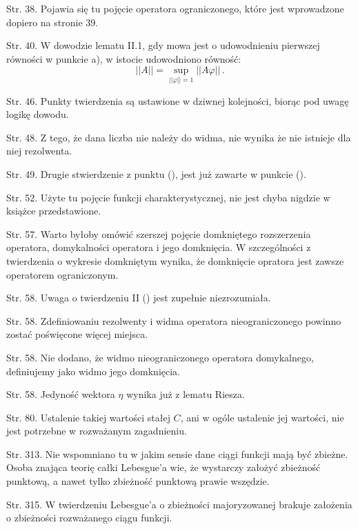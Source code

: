 \documentclass[a4paper,11pt]{article}
\begin{document}
 Str. 38. Pojawia się tu pojęcie operatora ograniczonego, które
  jest wprowadzone dopiero na stronie 39.

 Str. 40. W dowodzie lematu II.1, gdy mowa jest o udowodnieniu
  pierwszej równości w punkcie a), w istocie udowodniono równość:
  $$|| A || = \sup_{ || \varphi || = 1 } || A \varphi || \, .$$

 Str. 46. Punkty twierdzenia są ustawione w dziwnej kolejności,
  biorąc pod uwagę logikę dowodu.

 Str. 48. Z tego, że dana liczba nie należy do widma, nie wynika
  że nie istnieje dla niej rezolwenta.

 Str. 49. Drugie stwierdzenie z punktu (), jest już
  zawarte w punkcie ().

 Str. 52. Użyte tu pojęcie funkcji charakterystycznej, nie jest
  chyba nigdzie w książce przedstawione.

 Str. 57. Warto byłoby omówić szerszej pojęcie domkniętego
  rozszerzenia operatora, domykalności operatora i jego domknięcia. W
  szczególności z twierdzenia o wykresie domkniętym wynika, że
  domknięcie opratora jest zawsze operatorem ograniczonym.

 Str. 58. Uwaga o twierdzeniu II () jest zupełnie
  niezrozumiała.

 Str. 58. Zdefiniowaniu rezolwenty i widma operatora
  nieograniczonego powinno zostać poświęcone więcej miejsca.

 Str. 58. Nie dodano, że widmo nieograniczonego operatora
  domykalnego, definiujemy jako widmo jego domknięcia.

 Str. 58. Jedyność wektora $\eta$ wynika już z lematu Riesza.

 Str. 80. Ustalenie takiej wartości stałej $C$, ani w ogóle
  ustalenie jej wartości, nie jest potrzebne w rozważanym zagadnieniu.

 Str. 313. Nie wspomniano tu w jakim sensie dane ciągi funkcji
  mają być zbieżne. Osoba znająca teorię całki Lebesgue'a wie, że
  wystarczy założyć zbieżność punktową, a nawet tylko zbieżność
  punktową prawie wszędzie.

 Str. 315. W twierdzeniu Lebesgue'a o zbieżności majoryzowanej
  brakuje założenia o zbieżności rozważanego ciągu funkcji.




\end{document}
